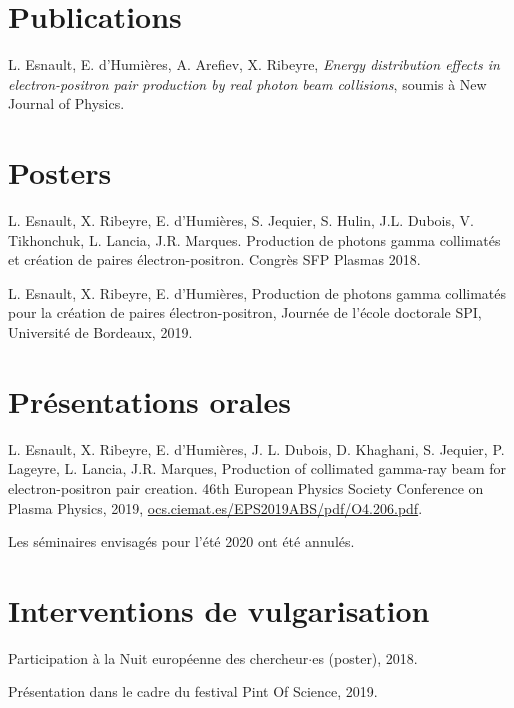 \section*{Publications}

\noindent L. Esnault, E. d'Humières, A. Arefiev, X. Ribeyre, \textit{Energy distribution effects in electron-positron pair production by real photon beam collisions}, soumis à New Journal of Physics.

\section*{Posters}

\noindent L. Esnault, X. Ribeyre, E. d'Humières, S. Jequier, S. Hulin, J.L. Dubois, V. Tikhonchuk, L. Lancia, J.R. Marques. Production de photons gamma collimatés et création de paires électron-positron. Congrès SFP Plasmas 2018.

\noindent L. Esnault, X. Ribeyre, E. d'Humières, Production de photons gamma collimatés pour la création de paires électron-positron, Journée de l'école doctorale SPI, Université de Bordeaux, 2019.

\section*{Présentations orales}
\noindent L. Esnault, X. Ribeyre, E. d’Humières, J. L. Dubois, D. Khaghani, S. Jequier, P. Lageyre, L. Lancia, J.R. Marques, Production of collimated gamma-ray beam for electron-positron pair creation. 46th European Physics Society Conference on Plasma Physics, 2019, \url{ocs.ciemat.es/EPS2019ABS/pdf/O4.206.pdf}.

\noindent Les séminaires envisagés pour l'été 2020 ont été annulés.

\section*{Interventions de vulgarisation}

\noindent Participation à la Nuit européenne des chercheur$\cdot$es (poster), 2018.

\noindent Présentation dans le cadre du festival Pint Of Science, 2019.
